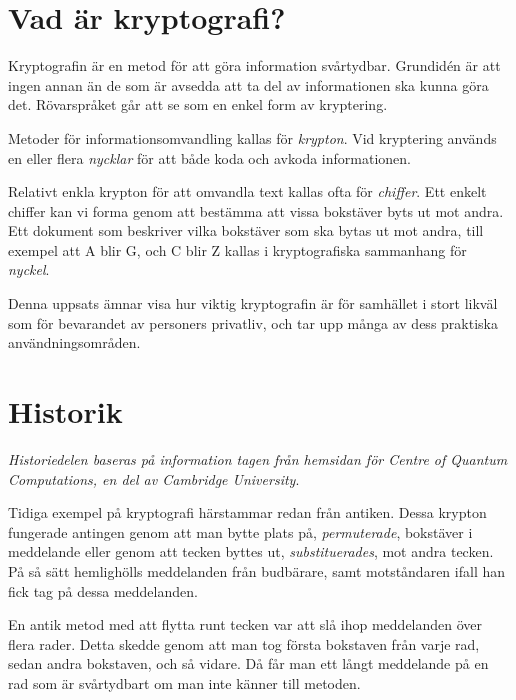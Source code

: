 \documentclass{article}
\begin{document}
\tableofcontents
\thispagestyle{empty}

\newpage

\setcounter{page}{1}

\section {Vad är kryptografi?}

Kryptografin är en metod för att göra information svårtydbar. Grundidén är att ingen annan än de som är avsedda att ta del av informationen ska kunna göra det. Rövarspråket går att se som en enkel form av kryptering.

Metoder för informationsomvandling kallas för \emph{krypton}. Vid kryptering används en eller flera \emph{nycklar} för att både koda och avkoda informationen.

Relativt enkla krypton för att omvandla text kallas ofta för \emph{chiffer}. Ett enkelt chiffer kan vi forma genom att bestämma att vissa bokstäver byts ut mot andra. Ett dokument som beskriver vilka bokstäver som ska bytas ut mot andra, till exempel att A blir G, och C blir Z kallas i kryptografiska sammanhang för \emph{nyckel}.

Denna uppsats ämnar visa hur viktig kryptografin är för samhället i stort likväl som för bevarandet av personers privatliv, och tar upp många av dess praktiska användningsområden.

\section {Historik}

\emph{Historiedelen baseras på information tagen från hemsidan för Centre of Quantum Computations, en del av Cambridge University}\cite{cqchist}. \newline

Tidiga exempel på kryptografi härstammar redan från antiken. Dessa krypton fungerade antingen genom att man bytte plats på, \emph{permuterade}, bokstäver i meddelande eller genom att tecken byttes ut, \emph{substituerades}, mot andra tecken. På så sätt hemlighölls meddelanden från budbärare, samt motståndaren ifall han fick tag på dessa meddelanden.

En antik metod med att flytta runt tecken var att slå ihop meddelanden över flera rader. Detta skedde genom att man tog första bokstaven från varje rad, sedan andra bokstaven, och så vidare. Då får man ett långt meddelande på en rad som är svårtydbart om man inte känner till metoden.\newline
\end{document}
